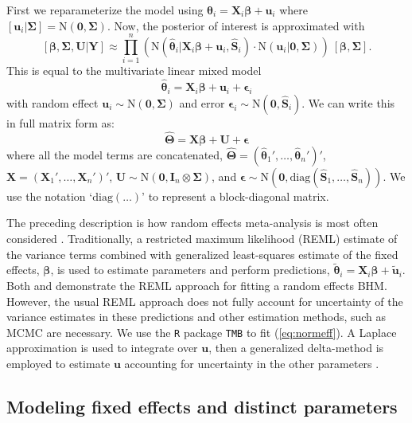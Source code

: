 \documentclass[12pt]{article}
\newcommand{\bt}{\boldsymbol{\theta}}
\newcommand{\bb}{\boldsymbol{\beta}}
\newcommand{\bT}{\boldsymbol{\Theta}}
\newcommand{\bSig}{\boldsymbol{\Sigma}}
\newcommand{\bS}{\mathbf{S}}
\newcommand{\bX}{\mathbf{X}}
\newcommand{\bU}{\mathbf{U}}
\newcommand{\bu}{\mathbf{u}}
\newcommand{\tN}{\text{N}}
\newcommand{\bY}{\mathbf{Y}}
\newcommand{\bI}{\mathbf{I}}
\newcommand{\bz}{\mathbf{0}}
\begin{document}
First we reparameterize the model using $\bt_i = \bX_i\bb + \bu_i$ where $[\bu_i|\bSig] = \tN(\mathbf{0},\bSig)$. Now, the posterior of interest is approximated with
\begin{equation}
\label{eq:normeff}
[\bb,\bSig,\bU|\bY] \approx  \prod_{i=1}^n\left(\tN(\hat{\bt}_i|\bX_i\bb+\bu_i, \hat{\bS}_i)\cdot \tN(\bu_i|\mathbf{0},\bSig)\right)\ [\bb, \bSig].
\end{equation}
This is equal to the multivariate linear mixed model
\[
\hat{\bt}_i = \bX_i\bb + \bu_i + \boldsymbol{\epsilon}_i
\]
with random effect $\bu_i \sim \text{N}(\mathbf{0},\bSig)$ and error $\boldsymbol{\epsilon}_i \sim \text{N}(\mathbf{0},\hat{\bS}_i)$. We can write this in full matrix form as:
\begin{equation}\label{eq:full.mat.form}
\hat{\bT} = \bX\bb + \bU + \boldsymbol{\epsilon}
\end{equation}
where all the model terms are concatenated, $\hat{\bT} = (\hat{\bt}_1',\dots,\hat{\bt}_n')'$, $\bX = (\bX_1',\dots,\bX_n')'$, $\bU \sim \tN(\bz, \bI_n\otimes\bSig)$, and $\boldsymbol{\epsilon} \sim \tN(\mathbf{0}, \text{diag}(\hat{\bS}_1,\dots,\hat{\bS}_n))$. We use the notation `$\text{diag}(\dots)$' to represent a block-diagonal matrix. 

The preceding description is how random effects meta-analysis is most often considered \citep{higgins2009re}. Traditionally, a restricted maximum likelihood (REML) estimate of the variance terms combined with generalized least-squares estimate of the fixed effects, $\bb$, is used to estimate parameters and perform predictions, $\tilde{\bt}_i = \bX_i\bb + \tilde{\bu}_i$. Both \citet{burnham2002evaluation} and \cite{zeppelin2019migratory} demonstrate the REML approach for fitting a random effects BHM. However, the usual REML approach does not fully account for uncertainty of the variance estimates in these predictions and other estimation methods, such as MCMC are necessary. We use the {\tt R} package {\tt TMB} to fit (\ref{eq:normeff}). A Laplace approximation is used to integrate over $\bu$, then a generalized delta-method \citep{Dorfman:1938af, ver2012invented} is employed to estimate $\bu$ accounting for uncertainty in the other parameters \citep{kristensen2016tmb,skaug2006automatic}. 






\subsection{Modeling fixed effects and distinct parameters}
\end{document}
